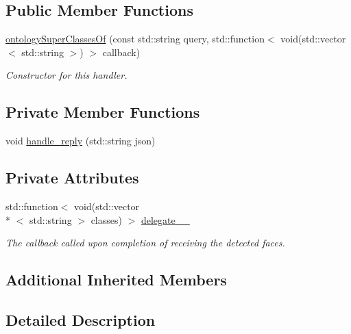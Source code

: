 \subsection*{Public Member Functions}
\begin{DoxyCompactItemize}
\item 
\hyperlink{classrapp_1_1cloud_1_1ontologySuperClassesOf_ad3deb8a1a1f303c6f721d92b9ee2553c}{ontology\-Super\-Classes\-Of} (const std\-::string query, std\-::function$<$ void(std\-::vector$<$ std\-::string $>$) $>$ callback)
\begin{DoxyCompactList}\small\item\em Constructor for this handler. \end{DoxyCompactList}\end{DoxyCompactItemize}
\subsection*{Private Member Functions}
\begin{DoxyCompactItemize}
\item 
void \hyperlink{classrapp_1_1cloud_1_1ontologySuperClassesOf_a4f4933a8220fde2be18e180be5ade709}{handle\-\_\-reply} (std\-::string json)
\end{DoxyCompactItemize}
\subsection*{Private Attributes}
\begin{DoxyCompactItemize}
\item 
std\-::function$<$ void(std\-::vector\\*
$<$ std\-::string $>$ classes) $>$ \hyperlink{classrapp_1_1cloud_1_1ontologySuperClassesOf_a44ae0e4c6d33f39b3161ee263b585604}{delegate\-\_\-\-\_\-}
\begin{DoxyCompactList}\small\item\em The callback called upon completion of receiving the detected faces. \end{DoxyCompactList}\end{DoxyCompactItemize}
\subsection*{Additional Inherited Members}


\subsection{Detailed Description}


